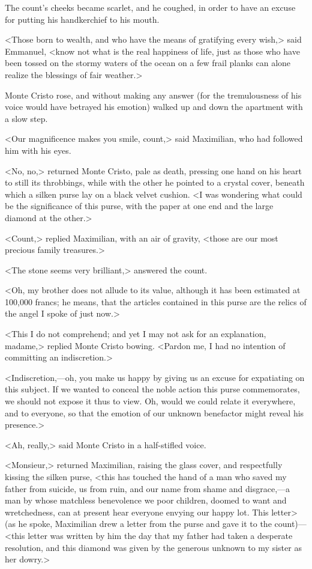  The count's cheeks became scarlet, and he coughed, in order to have an excuse for putting his handkerchief to his mouth. 

 <Those born to wealth, and who have the means of gratifying every wish,> said Emmanuel, <know not what is the real happiness of life, just as those who have been tossed on the stormy waters of the ocean on a few frail planks can alone realize the blessings of fair weather.> 

 Monte Cristo rose, and without making any answer (for the tremulousness of his voice would have betrayed his emotion) walked up and down the apartment with a slow step. 

 <Our magnificence makes you smile, count,> said Maximilian, who had followed him with his eyes. 

 <No, no,> returned Monte Cristo, pale as death, pressing one hand on his heart to still its throbbings, while with the other he pointed to a crystal cover, beneath which a silken purse lay on a black velvet cushion. <I was wondering what could be the significance of this purse, with the paper at one end and the large diamond at the other.> 

 <Count,> replied Maximilian, with an air of gravity, <those are our most precious family treasures.> 

 <The stone seems very brilliant,> answered the count. 

 <Oh, my brother does not allude to its value, although it has been estimated at 100,000 francs; he means, that the articles contained in this purse are the relics of the angel I spoke of just now.> 

 <This I do not comprehend; and yet I may not ask for an explanation, madame,> replied Monte Cristo bowing. <Pardon me, I had no intention of committing an indiscretion.> 

 <Indiscretion,—oh, you make us happy by giving us an excuse for expatiating on this subject. If we wanted to conceal the noble action this purse commemorates, we should not expose it thus to view. Oh, would we could relate it everywhere, and to everyone, so that the emotion of our unknown benefactor might reveal his presence.> 

 <Ah, really,> said Monte Cristo in a half-stifled voice. 

 <Monsieur,> returned Maximilian, raising the glass cover, and respectfully kissing the silken purse, <this has touched the hand of a man who saved my father from suicide, us from ruin, and our name from shame and disgrace,—a man by whose matchless benevolence we poor children, doomed to want and wretchedness, can at present hear everyone envying our happy lot. This letter> (as he spoke, Maximilian drew a letter from the purse and gave it to the count)—<this letter was written by him the day that my father had taken a desperate resolution, and this diamond was given by the generous unknown to my sister as her dowry.> 

